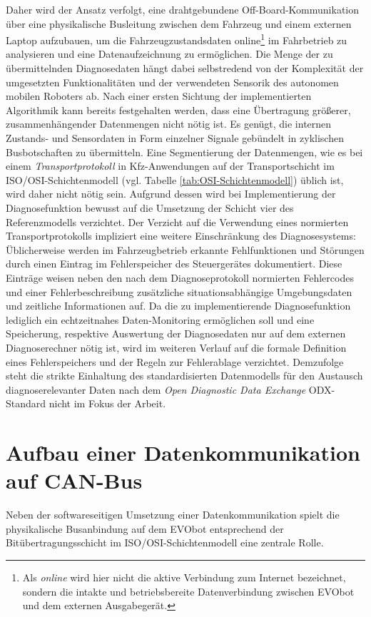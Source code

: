 Daher wird der Ansatz verfolgt, eine drahtgebundene Off-Board-Kommunikation über eine physikalische Busleitung zwischen dem Fahrzeug und einem externen Laptop aufzubauen, um die Fahrzeugzustandsdaten online\footnote{Als \emph{online} wird hier nicht die aktive Verbindung zum Internet bezeichnet, sondern die intakte und betriebsbereite Datenverbindung zwischen EVObot und dem externen Ausgabegerät.} im Fahrbetrieb zu analysieren und eine Datenaufzeichnung zu ermöglichen. Die Menge der zu übermittelnden Diagnosedaten hängt dabei selbstredend von der Komplexität der umgesetzten Funktionalitäten und der verwendeten Sensorik des autonomen mobilen Roboters ab. Nach einer ersten Sichtung der implementierten Algorithmik kann bereits festgehalten werden, dass eine Übertragung größerer, zusammenhängender Datenmengen nicht nötig ist. Es genügt, die internen Zustands- und Sensordaten in Form einzelner Signale gebündelt in zyklischen Busbotschaften zu übermitteln. Eine Segmentierung der Datenmengen, wie es bei einem \emph{Transportprotokoll} in Kfz-Anwendungen auf der Transportschicht im ISO/OSI-Schichtenmodell (vgl. Tabelle \ref{tab:OSI-Schichtenmodell}) üblich ist, wird daher nicht nötig sein. Aufgrund dessen wird bei Implementierung der Diagnosefunktion bewusst auf die Umsetzung der Schicht vier des Referenzmodells verzichtet.
Der Verzicht auf die Verwendung eines normierten Transportprotokolls impliziert eine weitere Einschränkung des Diagnosesystems: Üblicherweise werden im Fahrzeugbetrieb erkannte Fehlfunktionen und Störungen durch einen Eintrag im Fehlerspeicher des Steuergerätes dokumentiert. Diese Einträge weisen neben den nach dem Diagnoseprotokoll normierten Fehlercodes und einer Fehlerbeschreibung zusätzliche situationsabhängige Umgebungsdaten und zeitliche Informationen auf. Da die zu implementierende Diagnosefunktion lediglich ein echtzeitnahes Daten-Monitoring ermöglichen soll und eine Speicherung, respektive  Auswertung der Diagnosedaten nur auf dem externen Diagnoserechner nötig ist, wird im weiteren Verlauf auf die formale Definition eines Fehlerspeichers und der Regeln zur Fehlerablage verzichtet. Demzufolge steht die strikte Einhaltung des standardisierten Datenmodells für den Austausch diagnoserelevanter Daten nach dem \emph{Open Diagnostic Data Exchange} \acs{ODX}-Standard nicht im Fokus der Arbeit.


\section{Aufbau einer Datenkommunikation auf CAN-Bus} \label{sec:AufbauDatenkommunikation} %
Neben der softwareseitigen Umsetzung einer Datenkommunikation spielt die physikalische Busanbindung auf dem EVObot entsprechend der Bitübertragungsschicht im ISO/OSI-Schichtenmodell eine zentrale Rolle. 

